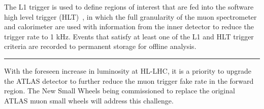 The L1 trigger is used to define regions of interest that are fed into the software high level trigger (HLT)~\cite{atlas_hlt_trigger_tdr}, in which the full granularity of the muon spectrometer and calorimeter are used with information from the inner detector to reduce the trigger rate to 1 kHz. Events that satisfy at least one of the L1 and HLT trigger criteria are recorded to permanent storage for offline analysis.

\begin{center}
  \noindent\rule[0.5ex]{0.1\linewidth}{0.5pt}
\end{center}

With the foreseen increase in luminosity at HL-LHC, it is a priority to upgrade the ATLAS detector to further reduce the muon trigger fake rate in the forward region. The New Small Wheels being commissioned to replace the original ATLAS muon small wheels will address this challenge.